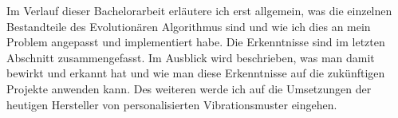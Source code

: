 
Im Verlauf dieser Bachelorarbeit erl{\"a}utere ich erst allgemein, was die einzelnen Bestandteile des Evolution{\"a}ren Algorithmus sind und wie ich dies an mein Problem angepasst und implementiert habe. Die Erkenntnisse sind im letzten Abschnitt zusammengefasst. 
Im Ausblick wird beschrieben, was man damit bewirkt und erkannt hat und wie man diese Erkenntnisse auf die zuk{\"u}nftigen Projekte anwenden kann. 
Des weiteren werde ich auf die Umsetzungen der heutigen Hersteller von personalisierten Vibrationsmuster eingehen.

